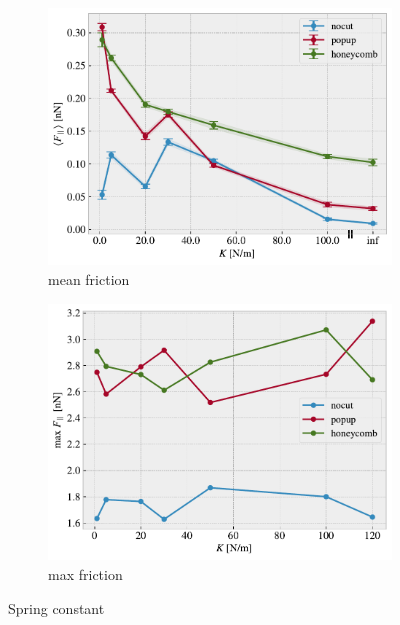\begin{figure}[H]
  \centering
  \begin{subfigure}[b]{0.49\textwidth}
      \centering
      \includegraphics[width=\textwidth]{figures/baseline/variables_spring_mean_K30.pdf}
      \caption{mean friction}
      \label{fig:var_K_mean}
  \end{subfigure}
  \hfill
  \begin{subfigure}[b]{0.49\textwidth}
      \centering
      \includegraphics[width=\textwidth]{figures/baseline/variables_spring_max_K30.pdf}
      \caption{max friction}
      \label{fig:var_K_max}
  \end{subfigure}
  \hfill
     \caption{Spring constant}
     \label{fig:var_K}
\end{figure}

